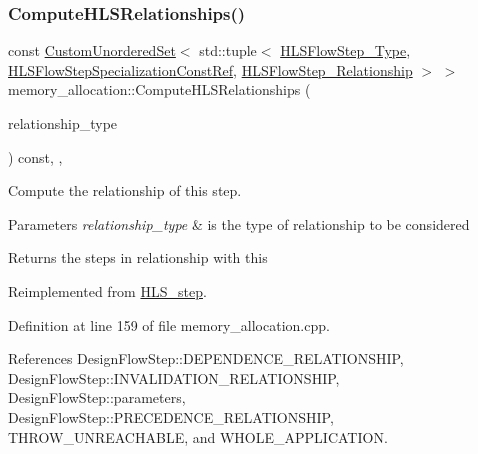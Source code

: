 \subsubsection{\texorpdfstring{Compute\+H\+L\+S\+Relationships()}{ComputeHLSRelationships()}}
{\footnotesize\ttfamily const \hyperlink{classCustomUnorderedSet}{Custom\+Unordered\+Set}$<$ std\+::tuple$<$ \hyperlink{hls__step_8hpp_ada16bc22905016180e26fc7e39537f8d}{H\+L\+S\+Flow\+Step\+\_\+\+Type}, \hyperlink{hls__step_8hpp_a5fdd2edf290c196531d21d68e13f0e74}{H\+L\+S\+Flow\+Step\+Specialization\+Const\+Ref}, \hyperlink{hls__step_8hpp_a3ad360b9b11e6bf0683d5562a0ceb169}{H\+L\+S\+Flow\+Step\+\_\+\+Relationship} $>$ $>$ memory\+\_\+allocation\+::\+Compute\+H\+L\+S\+Relationships (\begin{DoxyParamCaption}\item[{const \hyperlink{classDesignFlowStep_a723a3baf19ff2ceb77bc13e099d0b1b7}{Design\+Flow\+Step\+::\+Relationship\+Type}}]{relationship\+\_\+type }\end{DoxyParamCaption}) const\hspace{0.3cm}{\ttfamily [override]}, {\ttfamily [protected]}, {\ttfamily [virtual]}}



Compute the relationship of this step. 


\begin{DoxyParams}{Parameters}
{\em relationship\+\_\+type} & is the type of relationship to be considered \\
\hline
\end{DoxyParams}
\begin{DoxyReturn}{Returns}
the steps in relationship with this 
\end{DoxyReturn}


Reimplemented from \hyperlink{classHLS__step_aed0ce8cca9a1ef18e705fc1032ad4de5}{H\+L\+S\+\_\+step}.



Definition at line 159 of file memory\+\_\+allocation.\+cpp.



References Design\+Flow\+Step\+::\+D\+E\+P\+E\+N\+D\+E\+N\+C\+E\+\_\+\+R\+E\+L\+A\+T\+I\+O\+N\+S\+H\+IP, Design\+Flow\+Step\+::\+I\+N\+V\+A\+L\+I\+D\+A\+T\+I\+O\+N\+\_\+\+R\+E\+L\+A\+T\+I\+O\+N\+S\+H\+IP, Design\+Flow\+Step\+::parameters, Design\+Flow\+Step\+::\+P\+R\+E\+C\+E\+D\+E\+N\+C\+E\+\_\+\+R\+E\+L\+A\+T\+I\+O\+N\+S\+H\+IP, T\+H\+R\+O\+W\+\_\+\+U\+N\+R\+E\+A\+C\+H\+A\+B\+LE, and W\+H\+O\+L\+E\+\_\+\+A\+P\+P\+L\+I\+C\+A\+T\+I\+ON.

